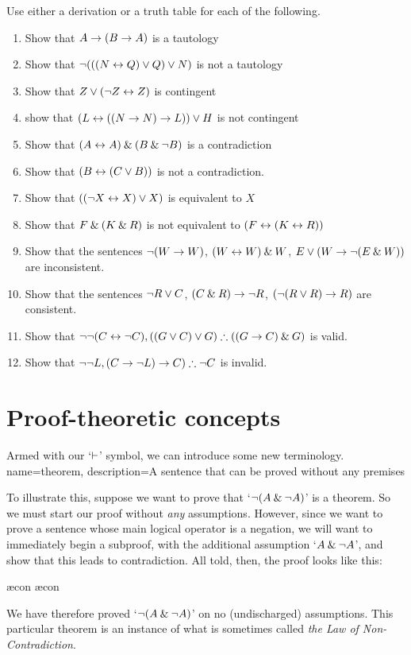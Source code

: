 \noindent\problempart Use either a derivation or a truth table for each of the following. 
\begin{enumerate}%
\item Show that $A \rightarrow (B \rightarrow A)$ is a tautology
\item Show that $\neg (((N \leftrightarrow Q) \vee Q) \vee N)$ is not a tautology
\item Show that $ Z \vee (\neg Z \leftrightarrow Z) $ is contingent
\item show that $ (L \leftrightarrow ((N \rightarrow N) \rightarrow L)) \vee H $ is not contingent
\item Show that $ (A \leftrightarrow A) \mathbin{\&} (B \mathbin{\&} \neg B)$ is a contradiction
\item Show that $ (B \leftrightarrow (C \vee B)) $ is not a contradiction.
\item Show that $ ((\neg X \leftrightarrow X) \vee X) $ is equivalent to $X$
\item Show that $F \mathbin{\&} (K \mathbin{\&} R) $ is not equivalent to $ (F \leftrightarrow (K \leftrightarrow R)) $
\item Show that the sentences $ \neg (W \rightarrow W)$, $(W \leftrightarrow W) \mathbin{\&} W$, $E \vee (W \rightarrow \neg (E \mathbin{\&} W))$ are inconsistent.
\item Show that the sentences  $\neg R \vee C $, $(C \mathbin{\&} R) \rightarrow \neg R$, $(\neg (R \vee R) \rightarrow R) $ are consistent.
\item Show that $\enot \enot (C \eiff \enot C), ((G \eor C) \eor G) \therefore ((G \eif C) \eand G) $ is valid.
\item Show that $ \enot \enot L,  (C \eif \enot L) \eif C) \therefore \enot C$ is invalid. 
\end{enumerate}


\chapter{Proof-theoretic concepts}\label{s:ProofTheoreticConcepts}
\nonexaminable


Armed with our `$\vdash$' symbol, we can introduce some new terminology.
{
name=theorem,
description={A sentence that can be proved without any premises}
}

        To illustrate this, suppose we want to prove that `$\neg (A \mathbin{\&} \neg A)$' is a theorem. So we must start our proof without \emph{any} assumptions. However, since we want to prove a sentence whose main logical operator is a negation, we will want to  immediately begin a subproof, with the additional assumption `$A \mathbin{\&} \neg A$', and show that this leads to contradiction. All told, then, the proof looks like this:
	\begin{pf}
		\open
			\ae{con}
			\ae{con}
		\close
	\end{pf}
We have therefore proved `$\neg (A \mathbin{\&} \neg A)$' on no (undischarged) assumptions. This particular theorem is an instance of what is sometimes called \emph{the Law of Non-Contradiction}.

